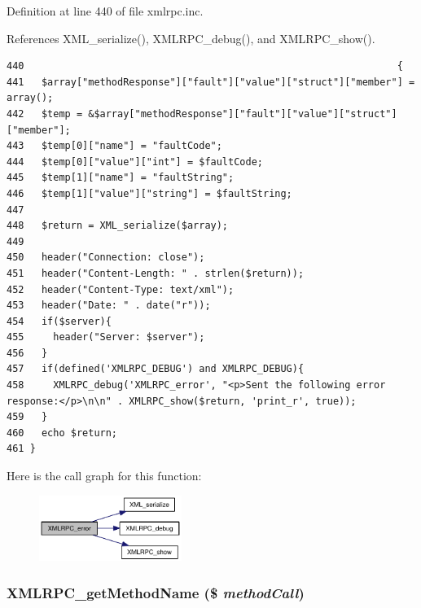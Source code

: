 Definition at line 440 of file xmlrpc.inc.

References XML\_\-serialize(), XMLRPC\_\-debug(), and XMLRPC\_\-show().

\begin{Code}\begin{verbatim}440                                                                {
441   $array["methodResponse"]["fault"]["value"]["struct"]["member"] = array();
442   $temp = &$array["methodResponse"]["fault"]["value"]["struct"]["member"];
443   $temp[0]["name"] = "faultCode";
444   $temp[0]["value"]["int"] = $faultCode;
445   $temp[1]["name"] = "faultString";
446   $temp[1]["value"]["string"] = $faultString;
447 
448   $return = XML_serialize($array);
449 
450   header("Connection: close");
451   header("Content-Length: " . strlen($return));
452   header("Content-Type: text/xml");
453   header("Date: " . date("r"));
454   if($server){
455     header("Server: $server");
456   }
457   if(defined('XMLRPC_DEBUG') and XMLRPC_DEBUG){
458     XMLRPC_debug('XMLRPC_error', "<p>Sent the following error response:</p>\n\n" . XMLRPC_show($return, 'print_r', true));
459   }
460   echo $return;
461 }
\end{verbatim}
\end{Code}




Here is the call graph for this function:\nopagebreak
\begin{figure}[H]
\begin{center}
\leavevmode
\includegraphics[width=131pt]{xmlrpc_8inc_0cdc54b1376ccbbe412175c9819a95ac_cgraph}
\end{center}
\end{figure}
\hypertarget{xmlrpc_8inc_70efa062e92a380196ed8053850c0906}{
\subsubsection{\setlength{\rightskip}{0pt plus 5cm}XMLRPC\_\-getMethodName (\$ {\em methodCall})}}
\label{xmlrpc_8inc_70efa062e92a380196ed8053850c0906}




